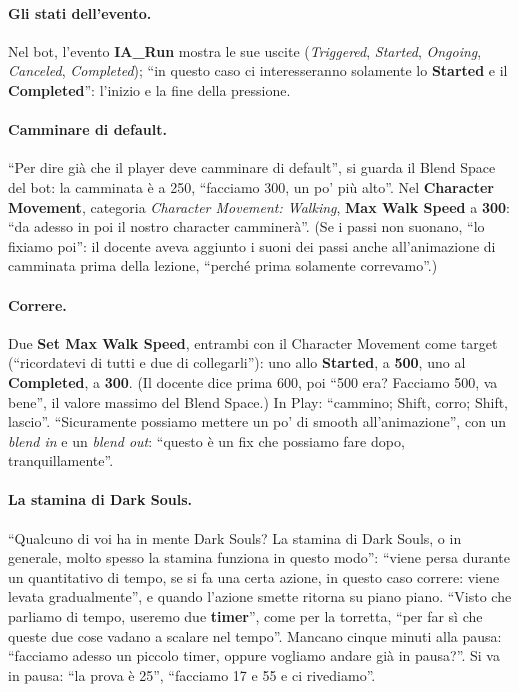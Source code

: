\paragraph{Gli stati dell'evento.} Nel bot, l'evento \textbf{IA\_Run} mostra le sue uscite
(\emph{Triggered}, \emph{Started}, \emph{Ongoing}, \emph{Canceled}, \emph{Completed});
``in questo caso ci interesseranno solamente lo \textbf{Started} e il
\textbf{Completed}'': l'inizio e la fine della pressione.

\paragraph{Camminare di default.} ``Per dire già che il player deve camminare di default'',
si guarda il Blend Space del bot: la camminata è a 250, ``facciamo 300, un po' più alto''.
Nel \textbf{Character Movement}, categoria \emph{Character Movement: Walking},
\textbf{Max Walk Speed} a \textbf{300}: ``da adesso in poi il nostro character camminerà''.
(Se i passi non suonano, ``lo fixiamo poi'': il docente aveva aggiunto i suoni dei passi
anche all'animazione di camminata prima della lezione, ``perché prima solamente
correvamo''.)

\paragraph{Correre.} Due \textbf{Set Max Walk Speed}, entrambi con il Character Movement
come target (``ricordatevi di tutti e due di collegarli''): uno allo \textbf{Started}, a
\textbf{500}, uno al \textbf{Completed}, a \textbf{300}. (Il docente dice prima 600, poi
``500 era? Facciamo 500, va bene'', il valore massimo del Blend Space.) In Play: ``cammino;
Shift, corro; Shift, lascio''. ``Sicuramente possiamo mettere un po' di smooth
all'animazione'', con un \emph{blend in} e un \emph{blend out}: ``questo è un fix che
possiamo fare dopo, tranquillamente''.

\paragraph{La stamina di Dark Souls.} ``Qualcuno di voi ha in mente Dark Souls? La stamina
di Dark Souls, o in generale, molto spesso la stamina funziona in questo modo'': ``viene
persa durante un quantitativo di tempo, se si fa una certa azione, in questo caso correre:
viene levata gradualmente'', e quando l'azione smette ritorna su piano piano. ``Visto che
parliamo di tempo, useremo due \textbf{timer}'', come per la torretta, ``per far sì che
queste due cose vadano a scalare nel tempo''. Mancano cinque minuti alla pausa: ``facciamo
adesso un piccolo timer, oppure vogliamo andare già in pausa?''. Si va in pausa: ``la
prova è 25'', ``facciamo 17 e 55 e ci rivediamo''.

